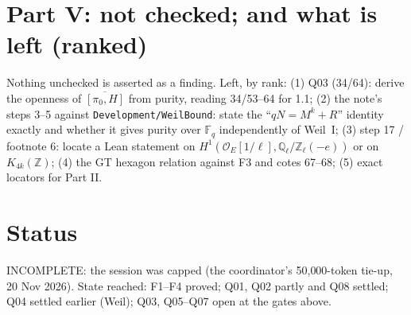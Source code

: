 \documentclass[11pt]{article}
\theoremstyle{definition}\newtheorem{definition}[theorem]{Definition}\newtheorem{remark}[theorem]{Remark}
\begin{document}
\section{Part V: not checked; and what is left (ranked)}
Nothing unchecked is asserted as a finding. Left, by rank: (1) Q03 (34/64): derive the openness of $\overline{[\pi_0,H]}$
from purity, reading 34/53--64 for 1.1; (2) the note's steps 3--5 against \texttt{Development/WeilBound}: state the
``$qN=M^k+R$'' identity exactly and whether it gives purity over $\mathbb F_q$ independently of Weil~I; (3) step 17 / footnote 6:
locate a Lean statement on $H^1(\mathcal O_E[1/\ell],\mathbb Q_\ell/\mathbb Z_\ell(-e))$ or on $K_{4k}(\mathbb Z)$; (4) the GT
hexagon relation against F3 and cotes 67--68; (5) exact locators for Part II.

\section{Status}
INCOMPLETE: the session was capped (the coordinator's 50{,}000-token tie-up, 20 Nov 2026). State reached: F1--F4 proved;
Q01, Q02 partly and Q08 settled; Q04 settled earlier (Weil); Q03, Q05--Q07 open at the gates above.
\end{document}
